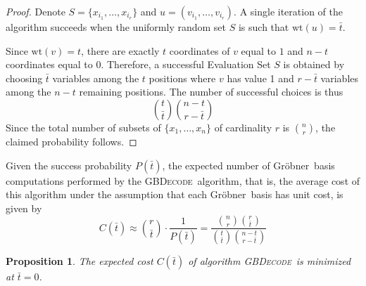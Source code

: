 \documentclass{amsart}
\newtheorem{proposition}[theorem]{Proposition}
\def\Gr{Gr\"obner}
\def\wt{{\mathrm{wt}}}
\def\GBDecode{{\textsc{GBDecode}}}
\def\bt{{\bar{t}}}
\begin{document}
\begin{proof}
Denote $S = \{x_{i_1},\ldots,x_{i_r}\}$ and $u = (v_{i_1},\ldots,v_{i_r})$.
A single iteration of the algorithm succeeds when the uniformly random set $S$
is such that $\wt(u) = \bt$.

Since $\wt(v) = t$, there are exactly $t$ coordinates of $v$ equal to $1$
and $n - t$ coordinates equal to $0$. Therefore, a successful Evaluation Set $S$
is obtained by choosing $\bt$ variables among the $t$ positions where $v$ has value 1
and $r - \bt$ variables among the $n - t$ remaining positions.
The number of successful choices is thus
\[
\binom{t}{\bt}\binom{n - t}{r - \bt}
\]
Since the total number of subsets of $\{x_1,\ldots,x_n\}$ of cardinality $r$ is
$\binom{n}{r}$, the claimed probability follows.
\end{proof}


Given the success probability $P(\bt)$, the expected number of \Gr\ basis
computations performed by the \GBDecode\ algorithm, that is, the average cost
of this algorithm under the assumption that each \Gr\ basis has unit cost,
is given by
\[
C(\bt) \approx \binom{r}{\bt} \cdot \frac{1}{P(\bt)} =
\frac{\binom{n}{r} \binom{r}{\bt}}{\binom{t}{\bt} \binom{n-t}{r-\bt}}
\]

\begin{proposition}
\label{isd-like-optimal}
The expected cost $C(\bt)$ of algorithm \GBDecode\ is minimized at $\bt = 0$.
\end{proposition}
\end{document}
